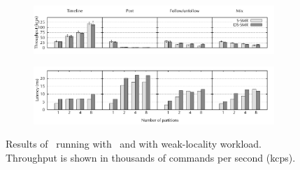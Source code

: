 \begin{figure}[ht!]
\centering
\begin{subfigure}{1\columnwidth}
      \centering
      \includegraphics[width=\textwidth]{./figures/experiments/dssmr/dssmr-weak-locality-tp}
\end{subfigure}
\begin{subfigure}{1\columnwidth}
      \centering
      \includegraphics[width=\textwidth]{./figures/experiments/dssmr/dssmr-weak-locality-lat}
\end{subfigure}
\caption{Results of \dssmrappname\ running with \ssmr\ and \dssmr{} with weak-locality workload. Throughput is shown in thousands of commands per second (kcps).}
\label{fig:dssmr-weakloc}
\end{figure}
      